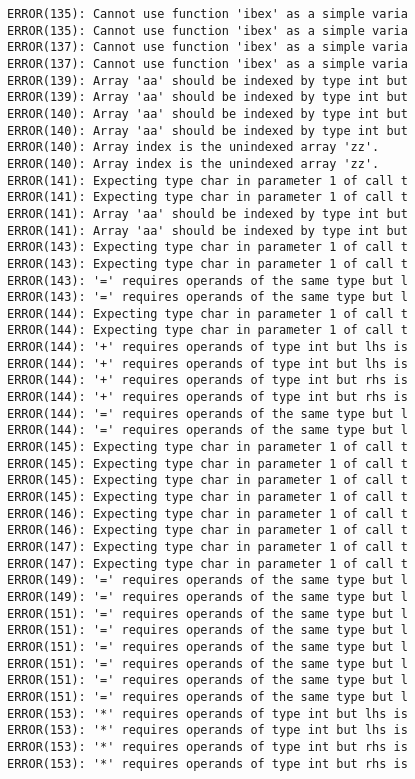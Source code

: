 \documentclass[12pt]{book}
\begin{document}
\begin{lstlisting}
ERROR(135): Cannot use function 'ibex' as a simple varia	ERROR(135): Cannot use function 'ibex' as a simple varia
ERROR(137): Cannot use function 'ibex' as a simple varia	ERROR(137): Cannot use function 'ibex' as a simple varia
ERROR(139): Array 'aa' should be indexed by type int but	ERROR(139): Array 'aa' should be indexed by type int but
ERROR(140): Array 'aa' should be indexed by type int but	ERROR(140): Array 'aa' should be indexed by type int but
ERROR(140): Array index is the unindexed array 'zz'.		ERROR(140): Array index is the unindexed array 'zz'.
ERROR(141): Expecting type char in parameter 1 of call t	ERROR(141): Expecting type char in parameter 1 of call t
ERROR(141): Array 'aa' should be indexed by type int but	ERROR(141): Array 'aa' should be indexed by type int but
ERROR(143): Expecting type char in parameter 1 of call t	ERROR(143): Expecting type char in parameter 1 of call t
ERROR(143): '=' requires operands of the same type but l	ERROR(143): '=' requires operands of the same type but l
ERROR(144): Expecting type char in parameter 1 of call t	ERROR(144): Expecting type char in parameter 1 of call t
ERROR(144): '+' requires operands of type int but lhs is	ERROR(144): '+' requires operands of type int but lhs is
ERROR(144): '+' requires operands of type int but rhs is	ERROR(144): '+' requires operands of type int but rhs is
ERROR(144): '=' requires operands of the same type but l	ERROR(144): '=' requires operands of the same type but l
ERROR(145): Expecting type char in parameter 1 of call t	ERROR(145): Expecting type char in parameter 1 of call t
ERROR(145): Expecting type char in parameter 1 of call t	ERROR(145): Expecting type char in parameter 1 of call t
ERROR(146): Expecting type char in parameter 1 of call t	ERROR(146): Expecting type char in parameter 1 of call t
ERROR(147): Expecting type char in parameter 1 of call t	ERROR(147): Expecting type char in parameter 1 of call t
ERROR(149): '=' requires operands of the same type but l	ERROR(149): '=' requires operands of the same type but l
ERROR(151): '=' requires operands of the same type but l	ERROR(151): '=' requires operands of the same type but l
ERROR(151): '=' requires operands of the same type but l	ERROR(151): '=' requires operands of the same type but l
ERROR(151): '=' requires operands of the same type but l	ERROR(151): '=' requires operands of the same type but l
ERROR(153): '*' requires operands of type int but lhs is	ERROR(153): '*' requires operands of type int but lhs is
ERROR(153): '*' requires operands of type int but rhs is	ERROR(153): '*' requires operands of type int but rhs is

\end{lstlisting}
\end{document}
